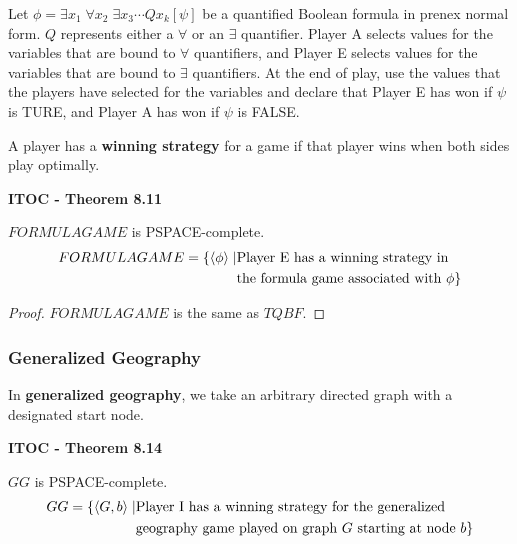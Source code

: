 Let $\phi = \exists x_1 \; \forall x_2 \; \exists x_3 \cdots Q x_k [\psi]$ be a quantified Boolean formula in prenex normal form. $Q$ represents either a $\forall$ or an $\exists$ quantifier. Player A selects values for the variables that are bound to $\forall$ quantifiers, and Player E selects values for the variables that are bound to $\exists$ quantifiers. At the end of play, use the values that the players have selected for the variables and declare that Player E has won if $\psi$ is TURE, and Player A has won if $\psi$ is FALSE.

A player has a \textbf{winning strategy} for a game if that player wins when both sides play optimally.

\label{lang:FORMULAGAME_PSPACEC}
\begin{shaded}
\textbf{ITOC - Theorem 8.11}

\medskip
$FORMULAGAME$ is PSPACE-complete.
\begin{align*}
FORMULAGAME = \{\langle{\phi}\rangle \mid & \text{Player E has a winning strategy in} \\
&\text{the formula game associated with $\phi$} \}
\end{align*}
\end{shaded}

\begin{mdframed}
\begin{proof}
$FORMULAGAME$ is the same as $TQBF$.
\end{proof}
\end{mdframed}

\subsubsection{Generalized Geography}

In \textbf{generalized geography}, we take an arbitrary directed graph with a designated start node.

\label{lang:GG_PSPACE}
\label{lang:GG_PSPACEC}
\begin{shaded}
\textbf{ITOC - Theorem 8.14}

\medskip
$GG$ is PSPACE-complete.
\begin{align*}
GG = \{ \langle{G, b}\rangle \mid & \text{Player I has a winning strategy for the generalized } \\
&\text{geography game played on graph $G$ starting at node $b$} \}
\end{align*}
\end{shaded}

